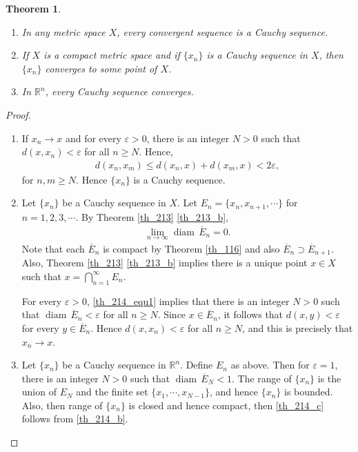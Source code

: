 \documentclass[11pt]{book}
\newtheorem{theorem}{Theorem}[chapter]
\theoremstyle{definition}
\numberwithin{equation}{chapter}
\def\diam{{\operatorname{diam}\,}}
\begin{document}
\begin{theorem}\label{th_214}
~\begin{enumerate}[label=(\alph*)]
    \item In any metric space $X$, every convergent sequence is a Cauchy sequence. \label{th_214_a}
    
    \item If $X$ is a compact metric space and if $\{x_n\}$ is a Cauchy sequence in $X$, then $\{x_n\}$ converges to some point of $X$. \label{th_214_b}
    
    \item In $\mathbb{R}^n$, every Cauchy sequence converges. \label{th_214_c}
\end{enumerate}
\end{theorem}
\begin{proof}
~\begin{enumerate}[label=(\alph*)]
    \item If $x_n \to x$ and for every $\varepsilon > 0$, there is an integer $N > 0$ such that $d(x,x_n) < \varepsilon$ for all $n \geq N$. Hence, 
    \begin{align*}
        d(x_n,x_m) \leq d(x_n,x) + d(x_m,x) < 2 \varepsilon,
    \end{align*}
    for $n,m \geq N$. Hence $\{x_n\}$ is a Cauchy sequence.
    
    \item Let $\{x_n\}$ be a Cauchy sequence in $X$. Let $E_n = \{x_n, x_{n+1}, \cdots\}$ for $n = 1,2,3,\cdots$. By Theorem \ref{th_213} \ref{th_213_b}, \begin{align}\label{th_214_equ1}
        \lim_{n\to\infty} \diam \overline{E}_n = 0.
    \end{align}
    Note that each $\overline{E}_n$ is compact by Theorem \ref{th_116} and also $\overline{E}_n \supset \overline{E}_{n+1}$. Also, Theorem \ref{th_213} \ref{th_213_b} implies there is a unique point $x \in X$ such that $x = \bigcap^\infty_{n=1} E_n$. 
    
    For every $\varepsilon > 0$, \eqref{th_214_equ1} implies that there is an integer $N > 0$ such that $\diam \overline{E}_n < \varepsilon$ for all $n \geq N$. Since $x \in \overline{E}_n$, it follows that $d(x,y) < \varepsilon$ for every $y \in \overline{E}_n$. Hence $d(x,x_n) < \varepsilon$ for all $n \geq N$, and this is precisely that $x_n \to x$. 
    
    \item Let $\{x_n\}$ be a Cauchy sequence in $\mathbb{R}^n$. Define $E_n$ as above. Then for $\varepsilon = 1$, there is an integer $N > 0$ such that $\diam \overline{E}_N < 1$. The range of $\{x_n\}$ is the union of $E_N$ and the finite set $\{x_1, \cdots, x_{N-1}\}$, and hence $\{x_n\}$ is bounded. Also, then range of $\{x_n\}$ is closed and hence compact, then \ref{th_214_c} follows from  \ref{th_214_b}.
\end{enumerate}
\end{proof}
\end{document}
